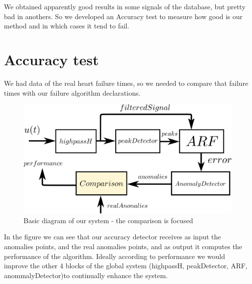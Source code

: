 \documentclass[conference]{IEEEtran}
\begin{document}
We obtained apparently good results in some signals of the database, but pretty bad in anothers. So we developed an Accuracy test to measure how good is our method and in which cases it tend to fail.

\section{Accuracy test}
We had data of the real heart failure times, so we needed to compare that failure times with our failure algorithm declarations. 
\begin{figure}[H]
\centerline{\includegraphics[scale=0.55]{imagenes/diagram2}}
\caption{Basic diagram of our system - the comparison is focused}
\label{fig}
\end{figure}
In the figure we can see that our accuracy detector receives as input the anomalies points, and the real anomalies points, and as output it computes the performance of the algorithm. Ideally according to performance we would improve the other 4 blocks of the global system (highpassH, peakDetector, ARF, anommalyDetector)to continually enhance the system.
\end{document}

